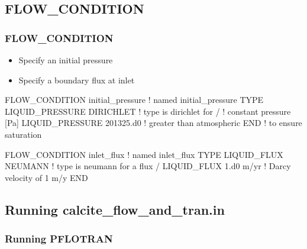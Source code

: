 \documentclass{beamer}
\newcommand\redcomment[1]{{{\color{red} #1}}}
\newcommand\bluecomment[1]{{{\color{blue} #1}}}
\newcommand\greencomment[1]{{{\color{green} #1}}}
\newcommand\magentacomment[1]{{{\color{magenta} #1}}}
\begin{document}
\subsection{FLOW\_CONDITION}

\begin{frame}[fragile]\frametitle{FLOW\_CONDITION}

\begin{itemize}
\item Specify an initial pressure
\item Specify a boundary flux at inlet
\end{itemize}

\begin{semiverbatim}
\magentacomment{FLOW_CONDITION initial_pressure} \bluecomment{! named \greencomment{initial_pressure}}
  \magentacomment{TYPE
    LIQUID_PRESSURE DIRICHLET} \bluecomment{! type is \redcomment{dirichlet} for}
  \magentacomment{/}                           \bluecomment{!   constant pressure [Pa]}
  \magentacomment{LIQUID_PRESSURE 201325.d0}   \bluecomment{! greater than atmospheric}
\magentacomment{END}                           \bluecomment{!   to ensure saturation}

\magentacomment{FLOW_CONDITION inlet_flux} \bluecomment{! named \greencomment{inlet_flux}}
  \magentacomment{TYPE
    LIQUID_FLUX NEUMANN}    \bluecomment{! type is \redcomment{neumann} for a flux}
  \magentacomment{/
  LIQUID_FLUX 1.d0 m/yr}    \bluecomment{! Darcy velocity of 1 m/y}
\magentacomment{END}
\end{semiverbatim}

\end{frame}

\subsection{Running calcite_flow_and_tran.in}

\begin{frame}[fragile]\frametitle{Running PFLOTRAN}


\end{frame}
\end{document}
